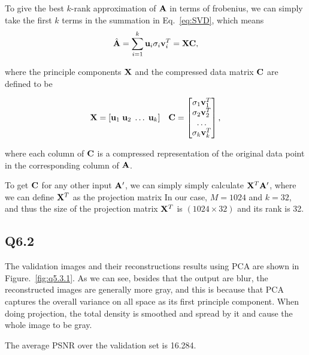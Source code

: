 \documentclass[11pt]{article}
\begin{document}
To give the best $k$-rank approximation of $\mathbf{A}$ in terms of frobenius, we can simply take the first $k$ terms in the summation in Eq.~\ref{eq:SVD}, which means
\begin{align}
  \hat{\mathbf{A}} = \sum_{i=1}^k \mathbf{u}_i \sigma_i \mathbf{v}_i^T = \mathbf{X} \mathbf{C},
\end{align}

where the principle components $\mathbf{X}$ and the compressed data matrix $\mathbf{C}$ are defined to be

\begin{align}
  \mathbf{X} = [ \mathbf{u}_1\;\mathbf{u}_2\;\dots\;\mathbf{u}_k ] \quad
  \mathbf{C} =
  \begin{bmatrix}
    \sigma_1\mathbf{v}_1^T \\ \sigma_2\mathbf{v}_2^T \\ \dots \\ \sigma_k\mathbf{v}_k^T
  \end{bmatrix},
\end{align}

where each column of $\mathbf{C}$ is a compressed representation of the original data point in the corresponding column of $\mathbf{A}$.

To get $\mathbf{C}$ for any other input $\mathbf{A}'$, we can simply simply calculate $\mathbf{X}^T\mathbf{A}'$, where we can define $\mathbf{X}^T$ as the projection matrix
In our case, $M=1024$ and $k=32$, and thus the size of the projection matrix $\mathbf{X}^T$ is $(1024 \times 32)$ and its rank is 32.

\newpage

\subsection*{Q6.2}

The validation images and their reconstructions results using PCA are shown in Figure.~\ref{fig:q5.3.1}. As we can see, besides that the output are blur, the reconstructed images are generally more gray, and this is because that PCA captures the overall variance on all space as its first principle component. When doing projection, the total density is smoothed and spread by it and cause the whole image to be gray.

The average PSNR over the validation set is 16.284.
\end{document}
